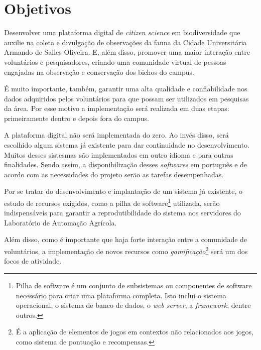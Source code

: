 \section*{Objetivos}
Desenvolver uma plataforma digital de \emph{citizen science} em biodiversidade que auxilie na coleta e divulgação de observações da fauna da Cidade Universitária Armando de Salles Oliveira. E, além disso, promover uma maior interação entre voluntários e pesquisadores, criando uma comunidade virtual de pessoas engajadas na observação e conservação dos bichos do campus.

É muito importante, também, garantir uma alta qualidade e confiabilidade nos dados adquiridos pelos voluntários para que possam ser utilizados em pesquisas da área. Por esse motivo a implementação será realizada em duas etapas: primeiramente dentro e depois fora do campus.

A plataforma digital não será implementada do zero. Ao invés disso, será escolhido algum sistema já existente para dar continuidade no desenvolvimento. Muitos desses sistesmas são implementados em outro idioma e para outras finalidades. Sendo assim, a disponibilização desses \emph{softwares} em português e de acordo com as necessidades do projeto serão as tarefas desempenhadas.

Por se tratar do desenvolvimento e implantação de um sistema já existente, o estudo de recursos exigidos, como a pilha de software\footnote{Pilha de software é um conjunto de subsistemas ou componentes de software necessário para criar uma plataforma completa. Isto inclui o sistema operacional, o sistema de banco de dados, o \emph{web server}, a \emph{framework}, dentre outros.} utilizada, serão indispensáveis para garantir a reprodutibilidade do sistema nos servidores do Laboratório de Automação Agrícola.

Além disso, como é importante que haja forte interação entre a comunidade de voluntários, a implementação de novos recursos como \emph{gamificação}\footnote{É a aplicação de elementos de jogos em contextos não relacionados aos jogos, como sistema de pontuação e recompensas.} será um dos focos de atividade.